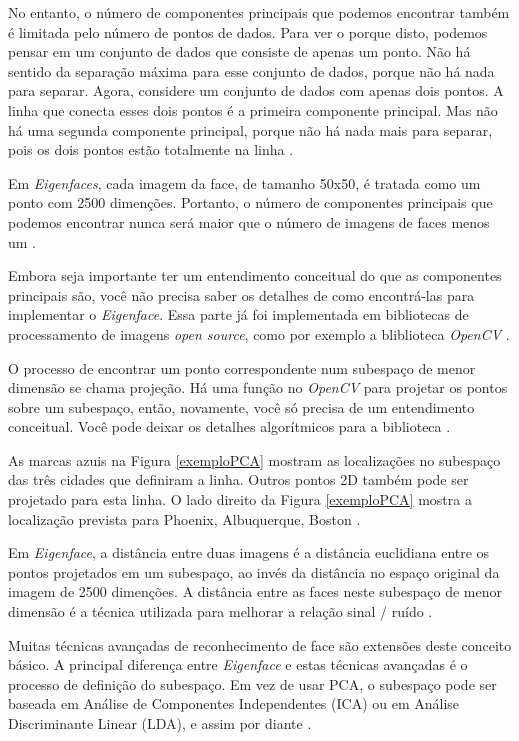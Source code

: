 No entanto, o número de componentes principais que podemos encontrar também é limitada pelo número de pontos de dados. Para ver o porque disto, podemos pensar em um conjunto de dados que consiste de apenas um ponto. Não há sentido da separação máxima para esse conjunto de dados, porque não há nada para separar. Agora, considere um conjunto de dados com apenas dois pontos. A linha que conecta esses dois pontos é a primeira componente principal. Mas não há uma segunda componente principal, porque não há nada mais para separar, pois os dois pontos estão totalmente na linha \cite{hewitt}.

Em \textit{Eigenfaces}, cada imagem da face, de tamanho 50x50, é tratada como um ponto com 2500 dimenções. Portanto, o número de componentes principais que podemos encontrar nunca será maior que o número de imagens de faces menos um \cite{hewitt}.

Embora seja importante ter um entendimento conceitual do que as componentes principais são, você não precisa saber os detalhes de como encontrá-las para implementar o \textit{Eigenface}. Essa parte já foi implementada em bibliotecas de processamento de imagens \textit{open source}, como por exemplo a bliblioteca \textit{OpenCV} \cite{hewitt}.

O processo de encontrar um ponto correspondente num subespaço de menor dimensão se chama projeção. Há uma função no \textit{OpenCV} para projetar os pontos sobre um subespaço, então, novamente, você só precisa de um entendimento conceitual. Você pode deixar os detalhes algorítmicos para a biblioteca \cite{hewitt}.

As marcas azuis na Figura \ref{exemploPCA} mostram as localizações no subespaço das três cidades que definiram a linha. Outros pontos 2D também pode ser projetado para esta linha. O lado direito da Figura \ref{exemploPCA} mostra a localização prevista para Phoenix, Albuquerque, Boston \cite{hewitt}.

Em \textit{Eigenface}, a distância entre duas imagens é a distância euclidiana entre os pontos projetados em um subespaço, ao invés da distância no espaço original da imagem de 2500 dimenções. A distância entre as faces neste subespaço de menor dimensão é a técnica utilizada para melhorar a relação sinal / ruído \cite{hewitt}.

Muitas técnicas avançadas de reconhecimento de face são extensões deste conceito básico. A principal diferença entre \textit{Eigenface} e estas técnicas avançadas é o processo de definição do subespaço. Em vez de usar PCA, o subespaço pode ser baseada em Análise de Componentes Independentes (ICA) ou em Análise Discriminante Linear (LDA), e assim por diante \cite{hewitt}.


